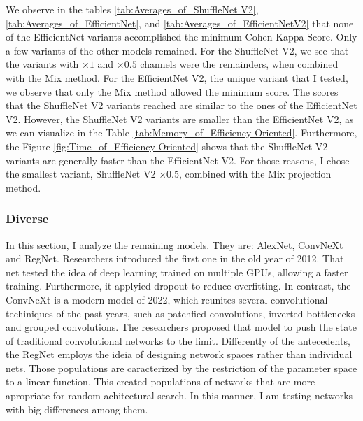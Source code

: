We observe in the tables \ref{tab:Averages_of_ShuffleNet V2}, \ref{tab:Averages_of_EfficientNet}, and \ref{tab:Averages_of_EfficientNetV2} that none of the EfficientNet variants accomplished the minimum Cohen Kappa Score. Only a few variants of the other models remained. For the ShuffleNet V2, we see that the variants with $\times 1$ and $\times 0.5$ channels were the remainders, when combined with the \gls{Mix} method. For the EfficientNet V2, the unique variant that I tested, we observe that only the \gls{Mix} method allowed the minimum score. The scores that the ShuffleNet V2 variants reached are similar to the ones of the EfficientNet V2. However, the ShuffleNet V2 variants are smaller than the EfficientNet V2, as we can visualize in the Table \ref{tab:Memory_of_Efficiency Oriented}. Furthermore, the Figure \ref{fig:Time_of_Efficiency Oriented} shows that the ShuffleNet V2 variants are generally faster than the EfficientNet V2. For those reasons, I chose the smallest variant, ShuffleNet V2 $\times 0.5$, combined with the \gls{Mix} projection method. 






\FloatBarrier


\subsubsection{Diverse}

In this section, I analyze the remaining models. They are: AlexNet, ConvNeXt and RegNet. Researchers introduced the first one in the old year of 2012. That net tested the idea of deep learning trained on multiple GPUs, allowing a faster training. Furthermore, it applyied dropout to reduce overfitting. In contrast, the ConvNeXt is a modern model of 2022, which reunites several convolutional techiniques of the past years, such as patchfied convolutions, inverted bottlenecks and grouped convolutions. The researchers proposed that model to push the state of traditional convolutional networks to the limit. Differently of the antecedents, the RegNet employs the ideia of designing network spaces rather than individual nets. Those populations are caracterized by the restriction of the parameter space to a linear function. This created populations of networks that are more apropriate for random achitectural search. In this manner, I am testing networks with big differences among them.

